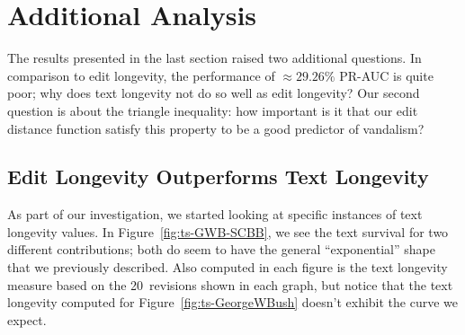\section{Additional Analysis}

The results presented in the last section raised two
additional questions.
In comparison to edit longevity, the performance of ${\approx}29.26\%$
PR-AUC is quite poor; why does text longevity not do so well as edit
longevity?
Our second question is about the triangle inequality:
how important is it that our edit distance function satisfy
this property to be a good predictor of vandalism?

\subsection{Edit Longevity Outperforms Text Longevity}

As part of our investigation, we started looking at specific
instances of text longevity values.
In Figure~\ref{fig:ts-GWB-SCBB},
we see the text survival for two different contributions;
both do seem to have the general ``exponential'' shape
that we previously described.
Also computed in each figure is the text longevity measure based on
the 20~revisions shown in each graph, but notice that the text
longevity computed for
Figure~\ref{fig:ts-GeorgeWBush} doesn't exhibit the curve we expect.

